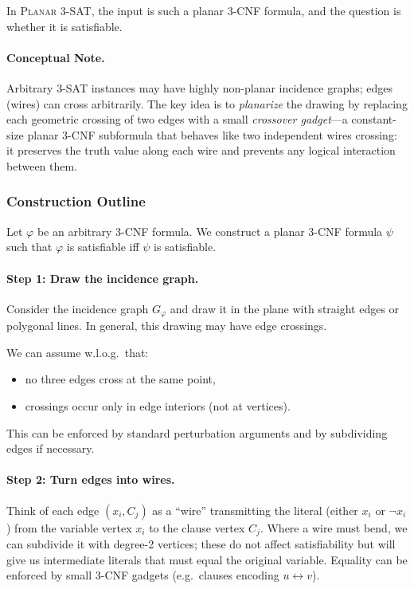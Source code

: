 \documentclass[9pt]{extarticle}
\begin{document}
In \textsc{Planar 3-SAT}, the input is such a planar 3-CNF formula, and the
question is whether it is satisfiable.

\paragraph{Conceptual Note.}
Arbitrary 3-SAT instances may have highly non-planar incidence graphs; edges
(wires) can cross arbitrarily.  The key idea is to \emph{planarize} the drawing
by replacing each geometric crossing of two edges with a small \emph{crossover
gadget}---a constant-size planar 3-CNF subformula that behaves like two
independent wires crossing: it preserves the truth value along each wire and
prevents any logical interaction between them.

\subsubsection*{Construction Outline}

Let $\varphi$ be an arbitrary 3-CNF formula.  We construct a planar 3-CNF
formula $\psi$ such that $\varphi$ is satisfiable iff $\psi$ is satisfiable.

\paragraph{Step 1: Draw the incidence graph.}
Consider the incidence graph $G_\varphi$ and draw it in the plane with straight
edges or polygonal lines.  In general, this drawing may have edge crossings.

We can assume w.l.o.g.\ that:
\begin{itemize}
    \item no three edges cross at the same point,
    \item crossings occur only in edge interiors (not at vertices).
\end{itemize}
This can be enforced by standard perturbation arguments and by subdividing edges
if necessary.

\paragraph{Step 2: Turn edges into wires.}

Think of each edge $(x_i,C_j)$ as a “wire” transmitting the literal (either
$x_i$ or $\neg x_i$) from the variable vertex $x_i$ to the clause vertex $C_j$.
Where a wire must bend, we can subdivide it with degree-2 vertices; these do
not affect satisfiability but will give us intermediate literals that must
equal the original variable.  Equality can be enforced by small 3-CNF gadgets
(e.g.\ clauses encoding $u \leftrightarrow v$).
\end{document}
